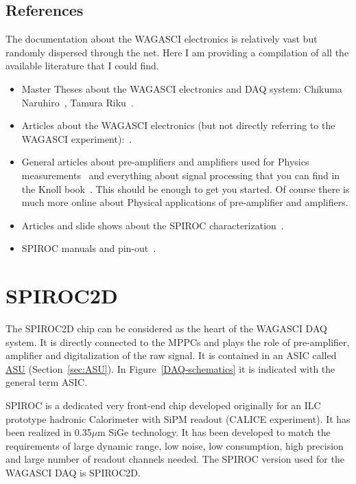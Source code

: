 \subsection{References}
The documentation about the WAGASCI electronics is relatively vast but randomly
dispersed through the net. Here I am providing a compilation of all the
available literature that I could find.

\begin{itemize}
\item Master Theses about the WAGASCI electronics and DAQ system: Chikuma
  Naruhiro~\cite{Chikuma:2016}, Tamura Riku~\cite{Tamura:2018}.
\item Articles about the WAGASCI electronics (but not directly referring to the
  WAGASCI experiment):~\cite{Gastaldi:2014vaa,Gastaldi:2014oid,GDCC:2012}.
\item General articles about pre-amplifiers and amplifiers used for Physics
  measurements~\cite{Hamamatsu:2001,Bertuccio:1996,Lioliou:2015,Ortec} and
  everything about signal processing that you can find in the Knoll
  book~\cite{Knoll:2010radiation}. This should be enough to get you started. Of
  course there is much more online about Physical applications of pre-amplifier
  and amplifiers.  
\item Articles and slide shows about the SPIROC
  characterization~\cite{Callier:2008,Callier:2009,Fabbri:2009,%
    Callier:2013,Callier:2015}.
\item SPIROC manuals and
  pin-out~\cite{SPIROC2Dpinlist,SPIROC2Ddatasheet,SPIROC:OMEGA}.
\end{itemize}

\section{SPIROC2D}
The SPIROC2D chip can be considered as the heart of the WAGASCI DAQ system. It
is directly connected to the MPPCs and plays the role of pre-amplifier,
amplifier and digitalization of the raw signal. It is contained in an ASIC
called \hyperref[sec:ASU]{ASU} (Section~\ref{sec:ASU}). In
Figure~\ref{DAQ-schematics} it is indicated with the general term ASIC.

SPIROC is a dedicated very front-end chip developed originally for an ILC
prototype hadronic Calorimeter with SiPM readout (CALICE experiment). It has
been realized in 0.35$\mu$m SiGe technology. It has been developed to match the
requirements of large dynamic range, low noise, low consumption, high precision
and large number of readout channels needed. The SPIROC version used for the
WAGASCI DAQ is SPIROC2D.

